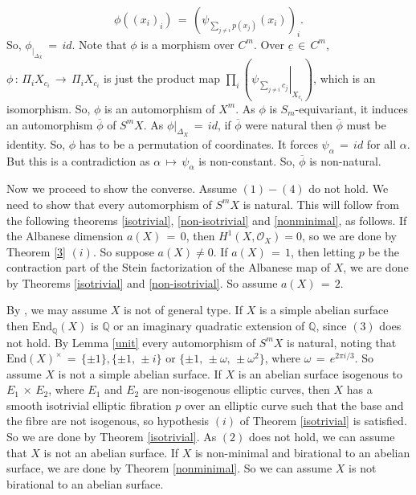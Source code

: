 \documentclass[12pt,reqno]{amsart}
\theoremstyle{definition}
\numberwithin{equation}{section}
\begin{document}
\begin{enumerate}
\begin{equation*}
\phi((x_{i})_{i})\,=\, \left(\psi_{{\sum_{j\neq i}p(x_{j})}}(x_{i})\right)_{i}. 
\end{equation*}
So, $\phi_{|_{\Delta_{X}}}\,=\, {id}$. Note that $\phi$ is a morphism over $C^{m}$. Over $\underline{c}\,\in\, C^{m}$, $\phi\,:\, \Pi_{i} X_{c_{i}}\,\longrightarrow\, \Pi_{i}X_{c_{i}}$ is just the product map $
\prod_i \left( \left. \psi_{{\sum}_{j \ne i} c_j} \right|_{X_{c_i}} \right)$, which is an isomorphism. So, $\phi$ is an automorphism of $X^{m}$. As $\phi$ is $S_{m}$-equivariant, it induces an automorphism $\overline{\phi}$ of $S^{m}X$. As $\left. \phi \right|_{\Delta_{X}}\,=\, {id}$, if $\overline{\phi}$ were natural then $\overline{\phi}$ must be identity. So, $\phi$ has to be a permutation of coordinates. It forces $\psi_{\alpha}\,=\, {id}$ for all $\alpha$. But this is a contradiction as $\alpha\,\longmapsto\, \psi_{\alpha}$ is non-constant. So, $\overline{\phi}$ is non-natural.





 \end{enumerate}

 Now we proceed to show the converse. Assume $(1)-(4)$ do not hold. We need to show that every automorphism of $S^m X$ is natural. This will follow from the following theorems  \ref{isotrivial}, \ref{non-isotrivial} and \ref{nonminimal}, as follows.  If the Albanese dimension $a(X)\,=\,0$, then $H^1(X, \mathcal{O}_X)=0$, so we are done by Theorem \ref{3} $(i)$. So suppose $a(X)\neq 0.$ If $a(X)\,=\,1$, then letting $p$ be the contraction part of the Stein factorization of the Albanese map of $X$, we are done by Theorems \ref{isotrivial} and \ref{non-isotrivial}. So assume $a(X)\,=\,2$. 
 
 By \cite{belmans2020automorphisms}, we may assume $X$ is not of general type. If $X$ is a simple abelian surface then $\textrm{End}_{\mathbb{Q}}(X)$ is  $\mathbb{Q}$ or an imaginary quadratic extension of $\mathbb{Q}$, since $(3)$ does not hold. By Lemma \ref{unit} every automorphism of $S^m X$ is natural, noting that $\textrm{End}(X)^\times\,=\,\{\pm 1\}, \{\pm 1,\, \pm i\}$ or $\{\pm 1,\, \pm \omega,\, \pm \omega^{2} \}$, where $\omega\,=\, e^{2\pi i/3}$. So assume $X$ is not a simple abelian surface. If $X$ is an abelian surface isogenous to $E_1\,\times\, E_2$, where $E_1$ and $ E_2$ are non-isogenous elliptic curves, then $X$ has a smooth isotrivial elliptic fibration $p$ over an elliptic curve such that the base and the fibre are not isogenous, so hypothesis $(i)$ of Theorem \ref{isotrivial} is satisfied. So we are done by Theorem \ref{isotrivial}. As $(2)$ does not hold, we can assume that $X$ is not an abelian surface. If $X$ is non-minimal and birational to an abelian surface, we are done by Theorem \ref{nonminimal}. So we can assume $X$ is not birational to an abelian surface.
\end{document}
